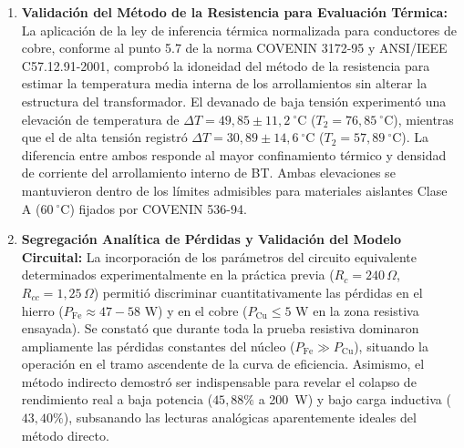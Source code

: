 \begin{enumerate}
    \item \textbf{Validación del Método de la Resistencia para Evaluación Térmica:}
    La aplicación de la ley de inferencia térmica normalizada para conductores de cobre, conforme al punto 5.7 de la norma COVENIN 3172-95 y ANSI/IEEE C57.12.91-2001, comprobó la idoneidad del método de la resistencia para estimar la temperatura media interna de los arrollamientos sin alterar la estructura del transformador. El devanado de baja tensión experimentó una elevación de temperatura de $\Delta T = 49{,}85 \pm 11{,}2~^{\circ}\mathrm{C}$ ($T_2 = 76{,}85~^{\circ}\mathrm{C}$), mientras que el de alta tensión registró $\Delta T = 30{,}89 \pm 14{,}6~^{\circ}\mathrm{C}$ ($T_2 = 57{,}89~^{\circ}\mathrm{C}$). La diferencia entre ambos responde al mayor confinamiento térmico y densidad de corriente del arrollamiento interno de BT. Ambas elevaciones se mantuvieron dentro de los límites admisibles para materiales aislantes Clase A ($60~^{\circ}\mathrm{C}$) fijados por COVENIN 536-94.

    \item \textbf{Segregación Analítica de Pérdidas y Validación del Modelo Circuital:}
    La incorporación de los parámetros del circuito equivalente determinados experimentalmente en la práctica previa ($R_c = 240\,\Omega$, $R_{cc} = 1{,}25\,\Omega$) permitió discriminar cuantitativamente las pérdidas en el hierro ($P_{\text{Fe}} \approx 47 - 58\text{ W}$) y en el cobre ($P_{\text{Cu}} \le 5\text{ W}$ en la zona resistiva ensayada). Se constató que durante toda la prueba resistiva dominaron ampliamente las pérdidas constantes del núcleo ($P_{\text{Fe}} \gg P_{\text{Cu}}$), situando la operación en el tramo ascendente de la curva de eficiencia. Asimismo, el método indirecto demostró ser indispensable para revelar el colapso de rendimiento real a baja potencia ($45{,}88\%$ a 200~W) y bajo carga inductiva ($43{,}40\%$), subsanando las lecturas analógicas aparentemente ideales del método directo.
\end{enumerate}
